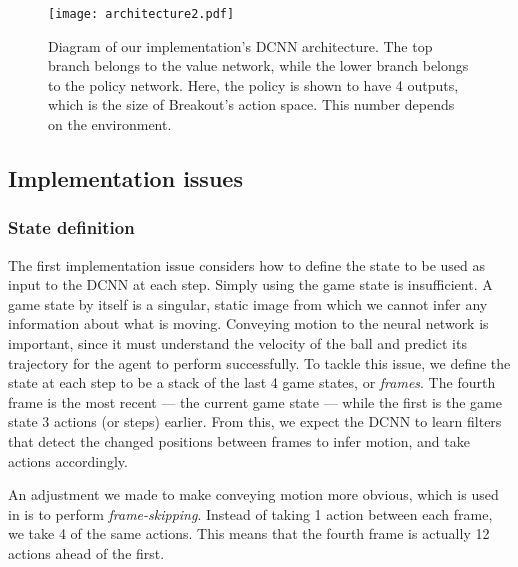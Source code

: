 \documentclass[12pt,a4paper]{article}
\begin{document}
\begin{figure}[ht]
    \centering
    \texttt{[image: architecture2.pdf]}
    \caption[]{Diagram of our implementation's DCNN architecture\footnotemark. The top branch belongs to the value network, while the lower branch belongs to the policy network. Here, the policy is shown to have 4 outputs, which is the size of Breakout's action space. This number depends on the environment.}
\end{figure}

\subsection{Implementation issues}
\subsubsection{State definition}
The first implementation issue considers how to define the state to be used as input to the DCNN at each step. Simply using the game state is insufficient. A game state by itself is a singular, static image from which we cannot infer any information about what is moving. Conveying motion to the neural network is important, since it must understand the velocity of the ball and predict its trajectory for the agent to perform successfully. To tackle this issue, we define the state at each step to be a stack of the last 4 game states, or \emph{frames}. The fourth frame is the most recent --- the current game state --- while the first is the game state 3 actions (or steps) earlier. From this, we expect the DCNN to learn filters that detect the changed positions between frames to infer motion, and take actions accordingly.

An adjustment we made to make conveying motion more obvious, which is used in \cite{Mnih2015} is to perform \emph{frame-skipping}. Instead of taking 1 action between each frame, we take 4 of the same actions. This means that the fourth frame is actually 12 actions ahead of the first. 
\end{document}
